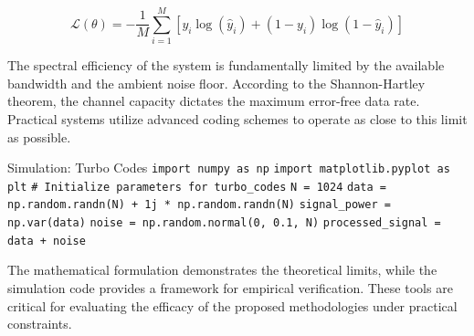 \begin{equation}
    \mathcal{L}(\theta) = -\frac{1}{M} \sum_{i=1}^{M} \left[ y_i \log(\hat{y}_i) + (1-y_i)\log(1-\hat{y}_i) \right]
\end{equation}

The spectral efficiency of the system is fundamentally limited by the available bandwidth and the ambient noise floor. According to the Shannon-Hartley theorem, the channel capacity dictates the maximum error-free data rate. Practical systems utilize advanced coding schemes to operate as close to this limit as possible.

\begin{pythonbox}{Simulation: Turbo Codes}
\texttt{import numpy as np}
\texttt{import matplotlib.pyplot as plt}
\texttt{}
\texttt{\# Initialize parameters for turbo\_codes}
\texttt{N = 1024}
\texttt{data = np.random.randn(N) + 1j * np.random.randn(N)}
\texttt{signal\_power = np.var(data)}
\texttt{noise = np.random.normal(0, 0.1, N)}
\texttt{processed\_signal = data + noise}
\end{pythonbox}

\vspace{0.5cm}
The mathematical formulation demonstrates the theoretical limits, while the simulation code provides a framework for empirical verification. These tools are critical for evaluating the efficacy of the proposed methodologies under practical constraints.

